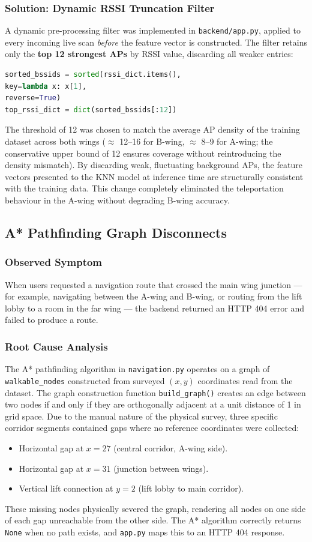 \documentclass[11pt,a4paper]{article}
\begin{document}
\subsubsection{Solution: Dynamic RSSI Truncation Filter}
A dynamic pre-processing filter was implemented in \texttt{backend/app.py}, applied to every incoming live scan \textit{before} the feature vector is constructed. The filter retains only the \textbf{top 12 strongest APs} by RSSI value, discarding all weaker entries:
\begin{lstlisting}[language=Python, caption=Top-K AP truncation filter in app.py]
sorted_bssids = sorted(rssi_dict.items(),
key=lambda x: x[1],
reverse=True)
top_rssi_dict = dict(sorted_bssids[:12])
\end{lstlisting}
The threshold of 12 was chosen to match the average AP density of the training dataset across both wings ($\approx$ 12--16 for B-wing, $\approx$ 8--9 for A-wing; the conservative upper bound of 12 ensures coverage without reintroducing the density mismatch). By discarding weak, fluctuating background APs, the feature vectors presented to the KNN model at inference time are structurally consistent with the training data. This change completely eliminated the teleportation behaviour in the A-wing without degrading B-wing accuracy.
\subsection{A* Pathfinding Graph Disconnects}
\subsubsection{Observed Symptom}
When users requested a navigation route that crossed the main wing junction --- for example, navigating between the A-wing and B-wing, or routing from the lift lobby to a room in the far wing --- the backend returned an HTTP 404 error and failed to produce a route.
\subsubsection{Root Cause Analysis}
The A* pathfinding algorithm in \texttt{navigation.py} operates on a graph of \texttt{walkable\_nodes} constructed from surveyed $(x, y)$ coordinates read from the dataset. The graph construction function \texttt{build\_graph()} creates an edge between two nodes if and only if they are orthogonally adjacent at a unit distance of 1 in grid space. Due to the manual nature of the physical survey, three specific corridor segments contained gaps where no reference coordinates were collected:
\begin{itemize}
\item Horizontal gap at $x = 27$ (central corridor, A-wing side).
\item Horizontal gap at $x = 31$ (junction between wings).
\item Vertical lift connection at $y = 2$ (lift lobby to main corridor).
\end{itemize}
These missing nodes physically severed the graph, rendering all nodes on one side of each gap unreachable from the other side. The A* algorithm correctly returns \texttt{None} when no path exists, and \texttt{app.py} maps this to an HTTP 404 response.
\end{document}
